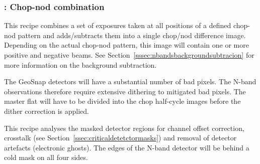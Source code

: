 \subsubsection{:  Chop-nod combination}
\label{img_n_chopnod}
\label{rec:img_n_chopnod}
\label{rec:metis_n_img_chopnod}
\label{sssec:img_n_chopnod}

This recipe combines a set of exposures taken at all positions of a
defined chop-nod pattern and adds/subtracts them into a single
chop/nod difference image. Depending on the actual chop-nod pattern,
this image will contain one or more positive and negative beams.
See Section~\ref{sssec:nbandsbackgroundsubtracion} for more information
on the background subtraction.

The GeoSnap detectors will have a substantial number of bad pixels.
The N-band observations therefore require extensive dithering to mitigated bad pixels.
The master flat will have to be divided into the chop half-cycle images before the dither correction is applied.

This recipe analyses the masked detector regions for channel offset correction, crosstalk (see Section~\ref{ssec:criticaldetetctormasks}) and removal of detector artefacts (electronic ghosts).
The edges of the N-band detector will be behind a cold mask on all four sides.


